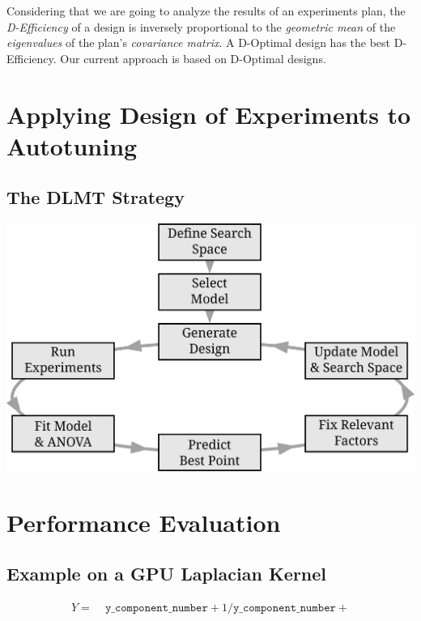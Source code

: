 \documentclass[conference]{IEEEtran}
\begin{document}
Considering that we are going to analyze the results of an experiments plan, the
\emph{D-Efficiency} of a design is inversely proportional to the \emph{geometric mean} of
the \emph{eigenvalues} of the plan's \emph{covariance matrix}. A D-Optimal design has the
best D-Efficiency. Our current approach is based on D-Optimal designs.
\section{Applying Design of Experiments to Autotuning}
\label{sec:org897e2d5}
\subsection{The DLMT Strategy}
\label{sec:orge664f06}
\begin{center}
\begin{center}
\includegraphics[width=.8\columnwidth]{./img/doe_anova_strategy.eps}
\end{center}
\end{center}
\section{Performance Evaluation}
\label{sec:org62eab34}
\subsection{Example on a GPU Laplacian Kernel}
\label{sec:org6ca5215}
{\small
\begin{align*}
Y = & \; \texttt{y\_component\_number} + 1 / \texttt{y\_component\_number} +
\end{align*}
}
\end{document}
